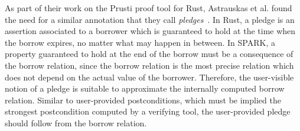 \documentclass[runningheads]{llncs}
\begin{document}
As part of their work on the Prusti proof tool for Rust, Astrauskas et al. found the need for a similar annotation that they call \emph{pledges}~\cite{astrauskas2019leveraging}. In Rust, a pledge is an assertion associated to a borrower which is guaranteed to hold at the time when the borrow expires, no matter what may happen in between. In SPARK, a property guaranteed to hold at the end of the borrow must be a consequence of the borrow relation, since the borrow relation is the most precise relation which does not depend on the actual value of the borrower. Therefore, the user-visible notion of a pledge is suitable to approximate the internally computed borrow relation. Similar to user-provided postconditions, which must be implied the strongest postcondition computed by a verifying tool, the user-provided pledge should follow from the borrow relation.
\end{document}
